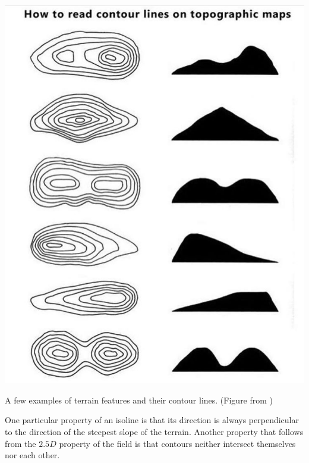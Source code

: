 \begin{marginfigure}
  \includegraphics{figs/contours.jpg}
  \caption{A few examples of terrain features and their contour lines. (Figure from \citet{Kjellstrom99})}%
\label{fig:contours}
\end{marginfigure}

One particular property of an isoline is that its direction is always perpendicular to the direction of the steepest slope of the terrain. 
Another property that follows from the $2.5D$ property of the field is that contours neither intersect themselves nor each other.

%

